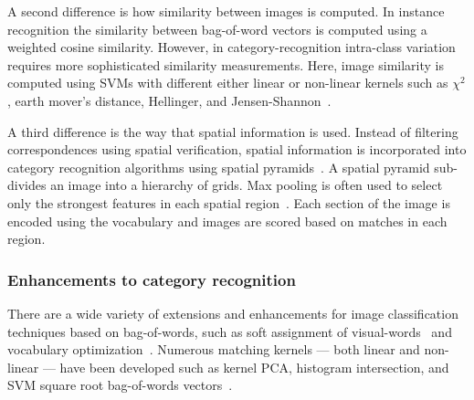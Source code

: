         A second difference is how similarity between images is computed. In instance recognition the similarity
        between bag-of-word vectors is computed using a weighted cosine similarity. However, in
        category-recognition intra-class variation requires more sophisticated similarity measurements. Here, image
        similarity is computed using SVMs with different either linear or non-linear kernels such as $\chi^2$,
        earth mover's distance, Hellinger, and Jensen-Shannon~\cite{zhang_local_2006, varma_learning_2007,
        vedaldi_efficient_2012}.

        A third difference is the way that spatial information is used. Instead of filtering correspondences using
        spatial verification, spatial information is incorporated into category recognition algorithms using
        spatial pyramids~\cite{grauman_pyramid_2005, lazebnik_beyond_2006}. A spatial pyramid sub-divides an image
        into a hierarchy of grids. Max pooling is often used to select only the strongest features in each spatial
        region~\cite{boureau_theoretical_2010, boureau_learning_2010}. Each section of the image is encoded using
        the vocabulary and images are scored based on matches in each region.

        \subsubsection{Enhancements to category recognition}
        There are a wide variety of extensions and enhancements for image classification techniques based on
        bag-of-words, such as soft assignment of visual-words~\cite{liu_defense_2011} and vocabulary
        optimization~\cite{wang_locality_constrained_2010}. Numerous matching kernels --- both linear and
        non-linear --- have been developed such as kernel PCA, histogram intersection, and SVM square root
        bag-of-words vectors~\cite{vedaldi_multiple_2009, maji_classification_2008, perronnin_large_scale_2010}.

